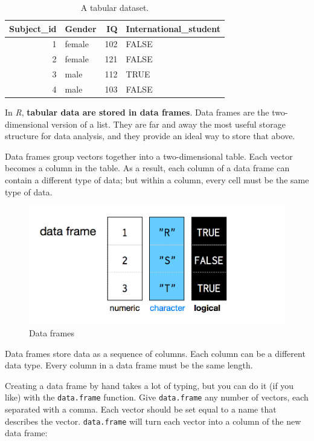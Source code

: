 \documentclass[
]{scrartcl}
\begin{document}
\begin{table}

\caption{\label{tab:unnamed-chunk-102}A tabular dataset.}
\centering
\begin{tabular}[t]{rlrl}
\toprule
Subject\_id & Gender & IQ & International\_student\\
\midrule
1 & female & 102 & FALSE\\
2 & female & 121 & FALSE\\
3 & male & 112 & TRUE\\
4 & male & 103 & FALSE\\
\bottomrule
\end{tabular}
\end{table}

In \emph{R}, \textbf{tabular data are stored in data frames}. Data frames are the two-dimensional version of a list. They are far and away the most useful storage structure for data analysis, and they provide an ideal way to store that above.

Data frames group vectors together into a two-dimensional table. Each vector becomes a column in the table. As a result, each column of a data frame can contain a different type of data; but within a column, every cell must be the same type of data.

\begin{figure}
\includegraphics[width=650px]{images/data_frame_types} \caption{Data frames}\label{fig:unnamed-chunk-103}
\end{figure}

Data frames store data as a sequence of columns. Each column can be a different data type. Every column in a data frame must be the same length.

Creating a data frame by hand takes a lot of typing, but you can do it (if you like) with the \texttt{data.frame} function. Give \texttt{data.frame} any number of vectors, each separated with a comma. Each vector should be set equal to a name that describes the vector. \texttt{data.frame} will turn each vector into a column of the new data frame:
\end{document}
